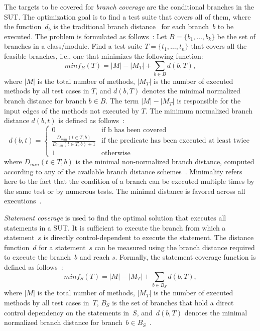 \documentclass[paper=a4,%
  twoside,%
  BCOR4mm,%
  abstract=true,%
  toc=bibliography,%
  chapterprefix=true,%
  toc=bibliographynumbered,%
  open=right,%
  english,%
  pagesize=pdftex]{scrreprt}
\newcommand{\sut}{\ac{SUT}\xspace}
\begin{document}
The targets to be covered for \emph{branch coverage} are the conditional branches in the \sut. The optimization goal is to find a test suite that covers all of them, where the function~$d_b$ is the traditional branch distance~\cite{Pacheco_2007} for each branch~$b$ to be executed. The problem is formulated as follows~\cite{Fraser2014}: Let $B = \{b_1, \dots, b_k\}$ be the set of branches in a class/module. Find a test suite $T = \{t_1, \dots, t_n\}$ that covers all the feasible branches, i.e., one that minimizes the following function:
\begin{equation}
minf_B(T) = \left|M\right| - \left|M_T\right| + \sum_{b \in B}{d(b, T)},
\end{equation}
where $\left|M\right|$ is the total number of methods, $\left|M_T\right|$ is the number of executed methods by all test cases in $T$, and $d(b, T)$ denotes the minimal normalized branch distance for branch $b \in B$. The term $\left|M\right| - \left|M_T\right|$ is responsible for the input edges of the methods not executed by $T$. The minimum normalized branch distance $d(b, t)$ is defined as follows~\cite{Fraser_2013}:
\begin{equation}
d(b, t) = \left\{ \begin{array}{cl}
0 & \textrm{if b has been covered} \\
\frac{D_{min}(t \in T, b)}{D_{min}(t \in T, b) + 1} & \textrm{if the predicate has been executed at least twice} \\
1 & \textrm{otherwise}
\end{array} \right.
\end{equation}
where $D_{min}(t \in T, b)$ is the minimal non-normalized branch distance, computed according to any of the available branch distance schemes~\cite{McMinn_2004}. Minimality refers here to the fact that the condition of a branch can be executed multiple times by the same test or by numerous tests. The minimal distance is favored across all executions~\cite{Panichella2018}.

\emph{Statement coverage} is used to find the optimal solution that executes all statements in a \sut. It is sufficient to execute the branch from which a statement~$s$ is directly control-dependent to execute the statement. The distance function~$d$ for a statement~$s$ can be measured using the branch distance required to execute the branch~$b$ and reach $s$. Formally, the statement coverage function is defined as follows~\cite{Fraser_2013}:
\begin{equation}
minf_S(T) = \left|M\right| - \left|M_T\right| + \sum_{b \in B_S}{d(b, T)},
\end{equation}
where $\left|M\right|$ is the total number of methods, $\left|M_T\right|$ is the number of executed methods by all test cases in~$T$, $B_S$ is the set of branches that hold a direct control dependency on the statements in~$S$, and~$d(b, T)$ denotes the minimal normalized branch distance for branch~$b \in B_S$~\cite{Panichella2018}.
\end{document}
